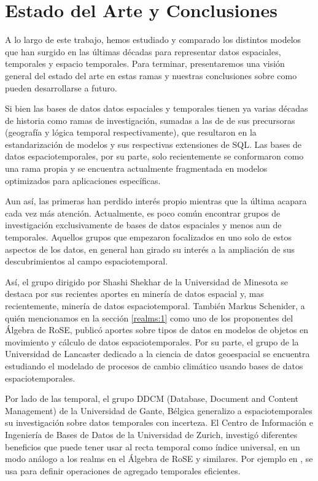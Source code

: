 \chapter{Estado del Arte y Conclusiones}  \label{cap:conc}

A lo largo de este trabajo, hemos estudiado y comparado los distintos modelos que han surgido en las últimas décadas para representar datos espaciales, temporales y espacio temporales. Para terminar, presentaremos una visión general del estado del arte en estas ramas y nuestras conclusiones sobre como pueden desarrollarse a futuro.

Si bien las bases de datos datos espaciales y temporales tienen ya varias décadas de historia como ramas de investigación, sumadas a las de de sus precursoras (geografía y lógica temporal respectivamente), que resultaron en la estandarización de modelos y sus respectivas extensiones de SQL. Las bases de datos espaciotemporales, por su parte, solo recientemente se conformaron como una rama propia y se encuentra actualmente fragmentada en modelos optimizados para aplicaciones específicas.

Aun así, las primeras han perdido interés propio mientras que la última acapara cada vez más atención. Actualmente, es poco común encontrar grupos de investigación exclusivamente de bases de datos espaciales y menos aun de temporales. Aquellos grupos que empezaron focalizados en uno solo de estos aspectos de los datos, en general han girado su interés a la ampliación de sus descubrimientos al campo espaciotemporal.

Así, el grupo dirigido por Shashi Shekhar de la Universidad de Minesota se destaca por sus recientes aportes en minería de datos espacial\textsuperscript{\cite{spatial:datamining}} y, mas recientemente, minería de datos espaciotemporal\textsuperscript{\cite{spatiotemporal:datamining}}. También Markus Schenider, a quién mencionamos en la sección \ref{realms:1} como uno de los proponentes del Álgebra de RoSE, publicó aportes sobre tipos de datos en modelos de objetos en movimiento\textsuperscript{\cite{schenider:moving}} y cálculo de datos espaciotemporales\textsuperscript{\cite{schenider:calculo}}. Por su parte, el grupo de la Universidad de Lancaster dedicado a la ciencia de datos geoespacial se encuentra estudiando el modelado de procesos de cambio climático usando bases de datos espaciotemporales\textsuperscript{\cite{climate}}.

Por lado de las temporal, el grupo DDCM (Database, Document and Content Management) de la Universidad
de Gante, Bélgica generalizo a espaciotemporales\textsuperscript{\cite{gant:st}} su investigación sobre datos
temporales con incerteza\textsuperscript{\cite{gant:t}}. El Centro de Información e Ingeniería de Bases de Datos de la Universidad de Zurich, investigó diferentes beneficios que puede tener usar al recta temporal como
índice universal, en un modo análogo a los realms en el Álgebra de RoSE y similares. Por ejemplo en \cite{sweeping}, se usa para definir operaciones de agregado temporales eficientes.

